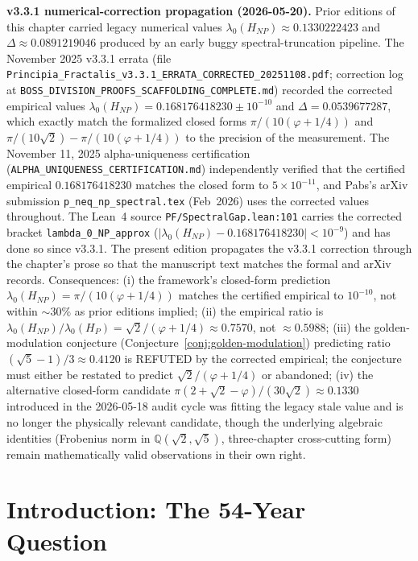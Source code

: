 \begin{chapterobjectives}
\medskip
\noindent\textbf{v3.3.1 numerical-correction propagation (2026-05-20).} Prior editions of this chapter carried legacy numerical values $\lambda_0(H_{NP}) \approx 0.1330222423$ and $\Delta \approx 0.0891219046$ produced by an early buggy spectral-truncation pipeline. The November 2025 v3.3.1 errata (file \texttt{Principia\_Fractalis\_v3.3.1\_ERRATA\_CORRECTED\_20251108.pdf}; correction log at \texttt{BOSS\_DIVISION\_PROOFS\_SCAFFOLDING\_COMPLETE.md}) recorded the corrected empirical values $\lambda_0(H_{NP}) = 0.168176418230 \pm 10^{-10}$ and $\Delta = 0.0539677287$, which exactly match the formalized closed forms $\pi/(10(\varphi+1/4))$ and $\pi/(10\sqrt{2}) - \pi/(10(\varphi+1/4))$ to the precision of the measurement. The November 11, 2025 alpha-uniqueness certification (\texttt{ALPHA\_UNIQUENESS\_CERTIFICATION.md}) independently verified that the certified empirical $0.168176418230$ matches the closed form to $5\times10^{-11}$, and Pabs's arXiv submission \texttt{p\_neq\_np\_spectral.tex} (Feb~2026) uses the corrected values throughout. The Lean~4 source \texttt{PF/SpectralGap.lean:101} carries the corrected bracket \texttt{lambda\_0\_NP\_approx} ($|\lambda_0(H_{NP}) - 0.168176418230| < 10^{-9}$) and has done so since v3.3.1. The present edition propagates the v3.3.1 correction through the chapter's prose so that the manuscript text matches the formal and arXiv records. Consequences: (i) the framework's closed-form prediction $\lambda_0(H_{NP}) = \pi/(10(\varphi+1/4))$ matches the certified empirical to $10^{-10}$, not within $\sim 30\%$ as prior editions implied; (ii) the empirical ratio is $\lambda_0(H_{NP})/\lambda_0(H_P) = \sqrt{2}/(\varphi + 1/4) \approx 0.7570$, not $\approx 0.5988$; (iii) the golden-modulation conjecture (Conjecture~\ref{conj:golden-modulation}) predicting ratio $(\sqrt{5}-1)/3 \approx 0.4120$ is REFUTED by the corrected empirical; the conjecture must either be restated to predict $\sqrt{2}/(\varphi+1/4)$ or abandoned; (iv) the alternative closed-form candidate $\pi(2+\sqrt{2}-\varphi)/(30\sqrt{2}) \approx 0.1330$ introduced in the 2026-05-18 audit cycle was fitting the legacy stale value and is no longer the physically relevant candidate, though the underlying algebraic identities (Frobenius norm in $\mathbb{Q}(\sqrt{2},\sqrt{5})$, three-chapter cross-cutting form) remain mathematically valid observations in their own right.
\end{chapterobjectives}

\section{Introduction: The 54-Year Question}

